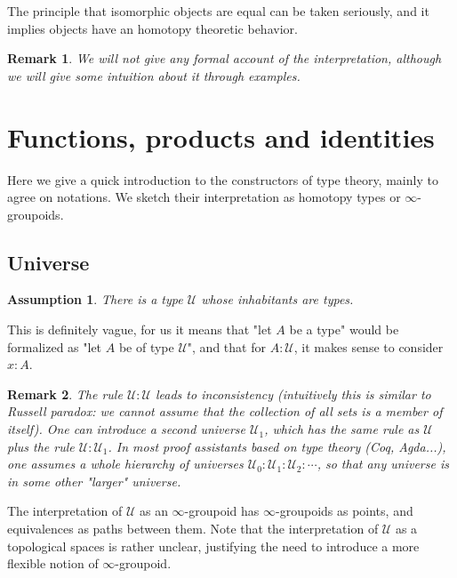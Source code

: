 \documentclass{article}
\newcommand{\se}[1]{\medbreak \medbreak \section{#1}}
\newcommand{\sse}[1]{\medbreak \subsection{#1}}
\newcommand{\U}{{\mathcal U}}
\newtheorem{remark}{Remark}
\newtheorem{assumption}{Assumption}
\begin{document}
\begin{center}
The principle that isomorphic objects are equal can be taken seriously, and it implies objects have an homotopy theoretic behavior.
\end{center}

\begin{remark}
We will not give any formal account of the interpretation, although we will give some intuition about it through examples.
\end{remark}


\se{Functions, products and identities}

Here we give a quick introduction to the constructors of type theory, mainly to agree on notations. We sketch their interpretation as homotopy types or $\infty$-groupoids.



\sse{Universe}

\begin{assumption}
There is a type $\U$ whose inhabitants are types.
\end{assumption}

This is definitely vague, for us it means that "let $A$ be a type" would be formalized as "let $A$ be of type $\U$", and that for $A:\U$, it makes sense to consider $x:A$.

\begin{remark}
The rule $\U:\U$ leads to inconsistency (intuitively this is similar to Russell paradox: we cannot assume that the collection of all sets is a member of itself). One can introduce a second universe $\U_1$, which has the same rule as $\U$ plus the rule $\U:\U_1$. In most proof assistants based on type theory (Coq, Agda...), one assumes a whole hierarchy of universes $\U_0:\U_1:\U_2:\cdots$, so that any universe is in some other "larger" universe.
\end{remark}


The interpretation of $\U$ as an $\infty$-groupoid has $\infty$-groupoids as points, and equivalences as paths between them. Note that the interpretation of $\U$ as a topological spaces is rather unclear, justifying the need to introduce a more flexible notion of $\infty$-groupoid.

\end{document}
